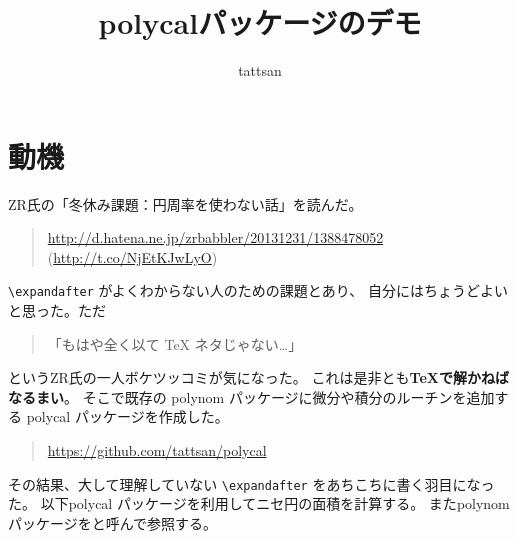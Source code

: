 \documentclass[dvipdfmx]{jsarticle}
\title{\textsf{polycal}パッケージのデモ}\author{tattsan}\date{}
\begin{document}
\maketitle

\section{動機}
ZR氏の「冬休み課題：円周率を使わない話」を読んだ。
\begin{quote}
  \url{http://d.hatena.ne.jp/zrbabbler/20131231/1388478052}
  (\url{http://t.co/NjEtKJwLyO})
\end{quote}
\verb+\expandafter+  がよくわからない人のための課題とあり、
自分にはちょうどよいと思った。ただ
\begin{quote}
  「もはや全く以て TeX ネタじゃない…」  
\end{quote}
というZR氏の一人ボケツッコミが気になった。
これは是非とも\textbf{\TeX で解かねばなるまい}。
そこで既存の \textsf{polynom} パッケージに微分や積分のルーチンを追加する
\textsf{polycal} パッケージを作成した。
\begin{quote}
  \url{https://github.com/tattsan/polycal}
\end{quote}
その結果、大して理解していない \verb|\expandafter| をあちこちに書く羽目になった。
以下\textsf{polycal} パッケージを利用してニセ円の面積を計算する。
また\textsf{polynom} パッケージをと呼んで参照する。
\end{document}
